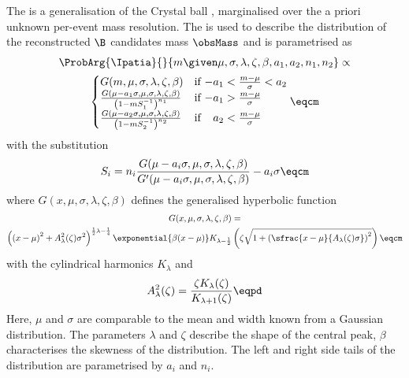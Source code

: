 The \Ipatia \PDF \cite{Santos:2013gra} is a generalisation of the Crystal ball
\PDF \cite{set:crystalball}, marginalised over the a priori unknown per-event
mass resolution. The \PDF is used to describe the distribution of the
reconstructed $\B$ candidates mass $\obsMass$ and is parametrised as
%
\begin{multline}\label{eq:measurement_of_sin2beta:likelihood_fit:pdfs:ipatia}
  \ProbArg{\text{\Ipatia}}{}{m \given \mu, \sigma, \lambda, \zeta, \beta, a_1, a_2, n_1, n_2} \propto \\
    \begin{cases}
      G(m, \mu, \sigma, \lambda, \zeta, \beta)    & \text{if $-a_1 < \frac{m-\mu}{\sigma} < a_2$} \\
      \frac{G(\mu - a_1 \sigma, \mu, \sigma, \lambda, \zeta, \beta)}{
        \left( 1 - m S_{1}^{-1} \right)^{n_1}
      }     & \text{if $-a_1 > \frac{m-\mu}{\sigma}$} \\
      \frac{G(\mu - a_2 \sigma, \mu, \sigma, \lambda, \zeta, \beta)}{
        \left( 1 - m S_{2}^{-1} \right)^{n_2}
      }     & \text{if $\phantom{-}a_2 < \frac{m-\mu}{\sigma}$} \\
  \end{cases}\eqcm
\end{multline}
%
with the substitution
%
\begin{equation}
  S_i =  n_i \frac{G(\mu - a_i \sigma, \mu, \sigma, \lambda, \zeta, \beta)}{G^\prime(\mu - a_i \sigma, \mu, \sigma, \lambda, \zeta, \beta)} - a_i \sigma \eqcm
\end{equation}
%
where $G(x, \mu, \sigma, \lambda, \zeta, \beta)$ defines the generalised hyperbolic function
\begin{multline}\label{eq:measurement_of_sin2beta:likelihood_fit:pdfs:generalised_hyperbolic}
  G(x, \mu, \sigma, \lambda, \zeta, \beta) = \\
  \left(\left(x - \mu\right)^2 + A_\lambda^2(\zeta) \sigma^2 \right)^{\frac{1}{2} \lambda - \frac{1}{4}}
  \exponential{\beta (x - \mu)} K_{\lambda-\frac{1}{2}}
  \left(\zeta \sqrt{1 + \left(\sfrac{x - \mu}{A_\lambda(\zeta) \sigma}\right)^2} \right)\eqcm
\end{multline}
%
with the cylindrical harmonics $K_\lambda$ and
%
\begin{equation}
  A_\lambda^2(\zeta) = \frac{\zeta K_\lambda(\zeta)}{K_{\lambda+1}(\zeta)}\eqpd
\end{equation}
%
Here, $\mu$ and $\sigma$ are comparable to the mean and width known from a
Gaussian distribution. The parameters $\lambda$ and $\zeta$ describe the shape
of the central peak, $\beta$ characterises the skewness of the distribution.
The left and right side tails of the distribution are parametrised by $a_i$ and
$n_i$.

